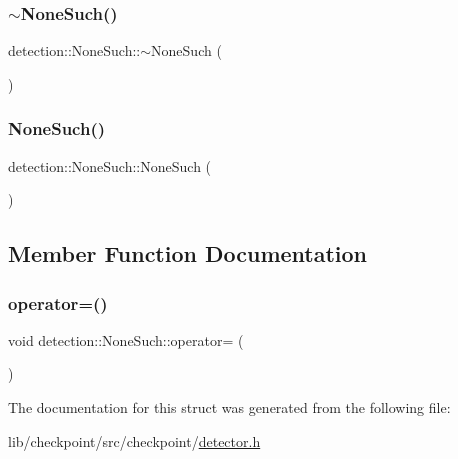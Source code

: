 \mbox{\label{structdetection_1_1_none_such_a0f135f597d286aa8b78074c552dfe137}} 
\subsubsection{\texorpdfstring{$\sim$\+None\+Such()}{~NoneSuch()}}
{\footnotesize\ttfamily detection\+::\+None\+Such\+::$\sim$\+None\+Such (\begin{DoxyParamCaption}{ }\end{DoxyParamCaption})\hspace{0.3cm}{\ttfamily [delete]}}

\mbox{\label{structdetection_1_1_none_such_afde4c614a0b571a38cb7fc1a68c81079}} 
\subsubsection{\texorpdfstring{None\+Such()}{NoneSuch()}\hspace{0.1cm}{\footnotesize\ttfamily [2/2]}}
{\footnotesize\ttfamily detection\+::\+None\+Such\+::\+None\+Such (\begin{DoxyParamCaption}\item[{\hyperlink{structdetection_1_1_none_such}{None\+Such} const \&}]{ }\end{DoxyParamCaption})\hspace{0.3cm}{\ttfamily [delete]}}



\subsection{Member Function Documentation}
\mbox{\label{structdetection_1_1_none_such_a2afbd1de76f456baf1e64e90454db0b3}} 
\subsubsection{\texorpdfstring{operator=()}{operator=()}}
{\footnotesize\ttfamily void detection\+::\+None\+Such\+::operator= (\begin{DoxyParamCaption}\item[{\hyperlink{structdetection_1_1_none_such}{None\+Such} const \&}]{ }\end{DoxyParamCaption})\hspace{0.3cm}{\ttfamily [delete]}}



The documentation for this struct was generated from the following file\+:\begin{DoxyCompactItemize}
\item 
lib/checkpoint/src/checkpoint/\hyperlink{detector_8h}{detector.\+h}\end{DoxyCompactItemize}
